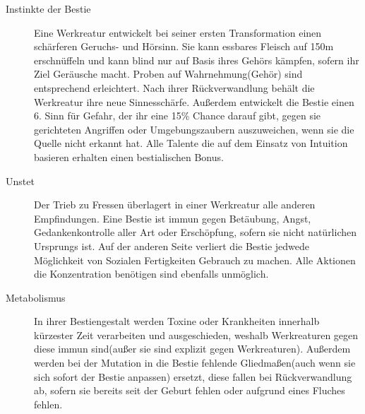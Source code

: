 \documentclass[a4paper,12pt,oneside]{book}
\begin{document}
\begin{description}
\begin{description}
\item[Instinkte der Bestie]
Eine Werkreatur entwickelt bei seiner ersten Transformation einen schärferen Geruchs- und Hörsinn. Sie kann essbares Fleisch auf 150m erschnüffeln und kann blind nur auf Basis ihres Gehörs kämpfen, sofern ihr Ziel Geräusche macht. Proben auf Wahrnehmung(Gehör) sind entsprechend erleichtert. Nach ihrer Rückverwandlung behält die Werkreatur ihre neue Sinnesschärfe. Außerdem entwickelt die Bestie einen 6. Sinn für Gefahr, der ihr eine 15\% Chance darauf gibt, gegen sie gerichteten Angriffen oder Umgebungszaubern auszuweichen, wenn sie die Quelle nicht erkannt hat. Alle Talente die auf dem Einsatz von Intuition basieren erhalten einen bestialischen Bonus.
\item[Unstet]
Der Trieb zu Fressen überlagert in einer Werkreatur alle anderen Empfindungen. Eine Bestie ist immun gegen Betäubung, Angst, Gedankenkontrolle aller Art oder Erschöpfung, sofern sie nicht natürlichen Ursprungs ist. Auf der anderen Seite verliert die Bestie jedwede Möglichkeit von Sozialen Fertigkeiten Gebrauch zu machen. Alle Aktionen die Konzentration benötigen sind ebenfalls unmöglich.
\item[Metabolismus]In ihrer Bestiengestalt werden Toxine oder Krankheiten innerhalb kürzester Zeit verarbeiten und ausgeschieden, weshalb Werkreaturen gegen diese immun sind(außer sie sind explizit gegen Werkreaturen). Außerdem werden bei der Mutation in die Bestie fehlende Gliedmaßen(auch wenn sie sich sofort der Bestie anpassen) ersetzt, diese fallen bei Rückverwandlung ab, sofern sie bereits seit der Geburt fehlen oder aufgrund eines Fluches fehlen.
\end{description}


\end{description}
\end{document}
